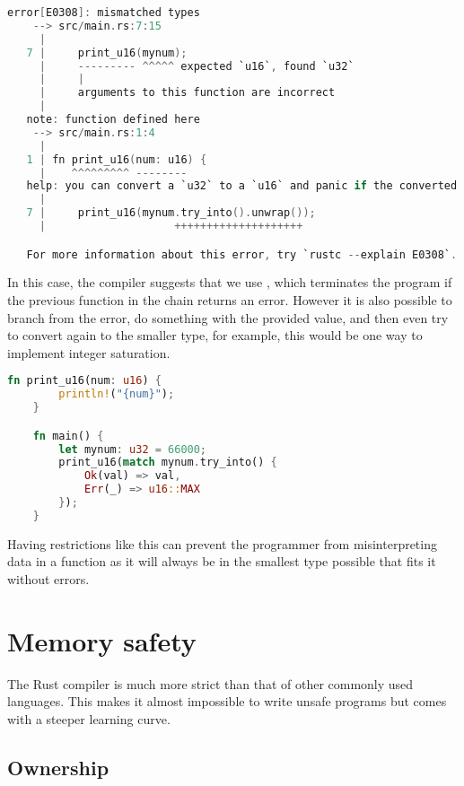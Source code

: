 \begin{lstlisting}[language=C,frame=single,float=!ht,label={lst:rust-reverse-conv-error},caption={Rust Type Conversion Error}]
    error[E0308]: mismatched types
    --> src/main.rs:7:15
     |
   7 |     print_u16(mynum);
     |     --------- ^^^^^ expected `u16`, found `u32`
     |     |
     |     arguments to this function are incorrect
     |
   note: function defined here
    --> src/main.rs:1:4
     |
   1 | fn print_u16(num: u16) {
     |    ^^^^^^^^^ --------
   help: you can convert a `u32` to a `u16` and panic if the converted value doesn't fit
     |
   7 |     print_u16(mynum.try_into().unwrap());
     |                    ++++++++++++++++++++

   For more information about this error, try `rustc --explain E0308`.
\end{lstlisting}

In this case, the compiler suggests that we use , which terminates the program if the previous function in the chain returns an error. However it is also possible to branch from the error, do something with the provided value, and then even try to convert again to the smaller type, for example, this would be one way to implement integer saturation.

\begin{lstlisting}[language=Rust,frame=single,float=!ht,style=customrust,label={lst:rust-cap-integer},caption={Branching from an Error}]
    fn print_u16(num: u16) {
        println!("{num}");
    }

    fn main() {
        let mynum: u32 = 66000;
        print_u16(match mynum.try_into() {
            Ok(val) => val,
            Err(_) => u16::MAX
        });
    }
\end{lstlisting}

Having restrictions like this can prevent the programmer from misinterpreting data in a function as it will always be in the smallest type possible that fits it without errors.

\section{Memory safety}

The Rust compiler is much more strict than that of other commonly used languages. This makes it almost impossible to write unsafe programs but comes with a steeper learning curve.

\subsection{Ownership}


